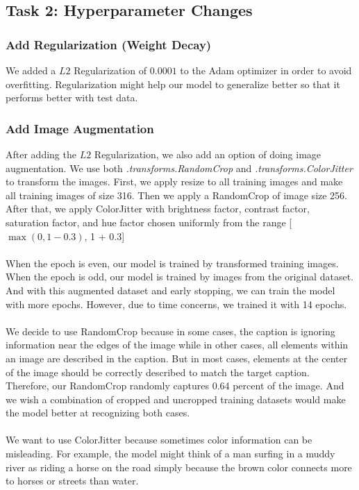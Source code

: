 \documentclass{article}
\begin{document}
    \subsection{Task 2: Hyperparameter Changes}
    \subsubsection{Add Regularization (Weight Decay)}
    We added a $L2$ Regularization of $0.0001$ to the Adam optimizer in order to avoid overfitting. Regularization might help our model to generalize better so that it performs better with test data. 
    \subsubsection{Add Image Augmentation}
    After adding the $L2$ Regularization, we also add an option of doing image augmentation. We use both \textit{.transforms.RandomCrop} and \textit{.transforms.ColorJitter} to transform the images. First, we apply resize to all training images and make all training images of size 316. Then we apply a RandomCrop of image size 256. After that, we apply ColorJitter with brightness factor, contrast factor, saturation factor, and hue factor chosen uniformly from  the range [$\max(0, 1 - 0.3)$, 1 + 0.3] \\ \\
    When the epoch is even, our model is trained by transformed training images. When the epoch is odd, our model is trained by images from the original dataset. And with this augmented dataset and early stopping, we can train the model with more epochs. However, due to time concerns, we trained it with 14 epochs. \\ \\ 
    We decide to use RandomCrop because in some cases, the caption is ignoring information near the edges of the image while in other cases, all elements within an image are described in the caption. But in most cases, elements at the center of the image should be correctly described to match the target caption. Therefore, our RandomCrop randomly captures 0.64 percent of the image. And we wish a combination of cropped and uncropped training datasets would make the model better at recognizing both cases. \\ \\
    We want to use ColorJitter because sometimes color information can be misleading. For example, the model might think of a man surfing in a muddy river as riding a horse on the road simply because the brown color connects more to horses or streets than water.
\end{document}
